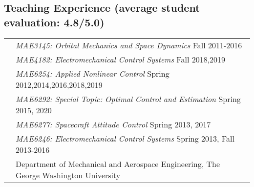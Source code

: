 \documentclass[10pt]{article}
\begin{document}
\vspace*{0.2cm}

\setlength{\tabcolsep}{0cm}
\subsection*{Teaching Experience \textnormal{\normalsize (average student evaluation: 4.8/5.0)}}
\begin{tabularx}{\textwidth}{>{\setlength{\hsize}{0.5cm}}X%
X}
&\textit{MAE3145: Orbital Mechanics and Space Dynamics} \hfill Fall 2011-2016\\
&\textit{MAE4182: Electromechanical Control Systems} \hfill Fall 2018,2019\\
&\textit{MAE6254: Applied Nonlinear Control} \hfill Spring 2012,2014,2016,2018,2019\\
&\textit{MAE6292: Special Topic: Optimal Control and Estimation} \hfill Spring 2015, 2020\\
&\textit{MAE6277: Spacecraft Attitude Control} \hfill Spring 2013, 2017\\
&\textit{MAE6246: Electromechanical Control Systems} \hfill Spring 2013, Fall 2013-2016\\
&Department of Mechanical and Aerospace Engineering, The George Washington University\vspace*{0.30cm}\\


\end{tabularx}
\end{document}
